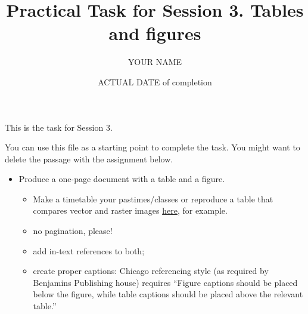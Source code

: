 \documentclass[a4paper,11pt]{article}
\title{Practical Task for Session 3. Tables and figures}
\author{YOUR NAME}
\date{ACTUAL DATE of completion}
\begin{document}
	
	\maketitle

This is the task for Session 3. 

\bigskip

You can use this file as a starting point to complete the task. You might want to delete the passage with the assignment below.

\bigskip

\begin{itemize}
	\item Produce a one-page document with a table and a figure.
	\begin{itemize}
		\item Make a timetable your pastimes/classes or reproduce a table that compares vector and raster images \href{https://tinyurl.com/yf8orxog}{here}, for example.
		\item no pagination, please!
		\item add in-text references to both;
		\item create proper captions: Chicago referencing style (as required by Benjamins Publishing house) requires ``Figure captions should be placed below the figure, while table captions should be placed above the relevant table.'' 
	\end{itemize} 
\end{itemize}
	
\end{document}
